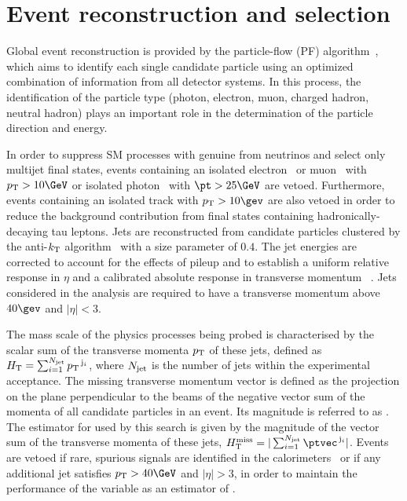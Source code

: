 \section{Event reconstruction and selection} %
\label{sec:event_selection}

Global event reconstruction is provided by the particle-flow (PF)
algorithm~\cite{CMS-PAS-PFT-09-001, CMS-PAS-PFT-10-001}, which aims to
identify each single candidate particle using an optimized combination
of information from all detector systems. In this process, the
identification of the particle type (photon, electron, muon, charged
hadron, neutral hadron) plays an important role in the determination
of the particle direction and energy. 

In order to suppress SM processes with genuine \ptvecmiss from
neutrinos and select only multijet final states, events containing an
isolated electron~\cite{PAS-EGM-10-004} or muon~\cite{PAS-MUO-10-004}
with $\Pt > 10\GeV$ or isolated photon~\cite{PAS-EGM-10-006} with $\pt
> 25\GeV$ are vetoed. Furthermore, events containing an isolated track
with $\Pt > 10\gev$ are also vetoed in order to reduce the background
contribution from final states containing hadronically-decaying tau
leptons. Jets are reconstructed from candidate particles clustered by
the anti-$k_{\rm T}$ algorithm~\cite{antikt} with a size parameter of
$0.4$. The jet energies are corrected to account for the effects of
pileup and to establish a uniform relative response in $\eta$ and a
calibrated absolute response in transverse momentum
\pt~\cite{2011arXiv1107.4277C}. Jets considered in the analysis are
required to have a transverse momentum above $40\gev$ and $|\eta| <
3$.

The mass scale of the physics processes being probed is characterised
by the scalar sum of the transverse momenta ${p_{\text T}}$ of these jets,
defined as $H_{\mathrm{T}} = \sum_{i=1}^{N_{\rm jet}} {p_{\text T}}^{\,\mathrm{j}_i}$,
where $N_{\rm jet}$ is the number of jets within the experimental
acceptance. The missing transverse momentum vector \ptvecmiss is
defined as the projection on the plane perpendicular to the beams of
the negative vector sum of the momenta of all candidate particles in
an event. Its magnitude is referred to as \ETmiss. The estimator for
\ETmiss used by this search is given by the magnitude of the vector
sum of the transverse momenta of these jets, $\mht =
|\sum_{i=1}^{N_\text{jet}} \ptvec^{\,\mathrm{j}_i}|$. Events are
vetoed if rare, spurious signals are identified in the
calorimeters~\cite{1748-0221-5-03-T03014, CMS-NOTE-2010-012} or if any
additional jet satisfies $\Pt > 40\GeV$ and $|\eta| > 3$, in order to
maintain the performance of the variable \mht as an estimator of
\ETmiss.

